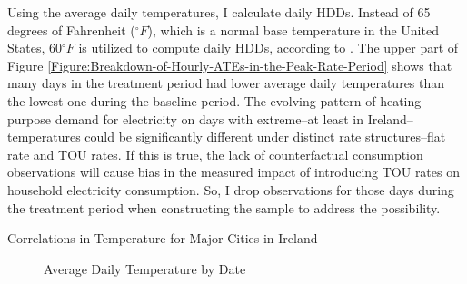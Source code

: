 Using the average daily temperatures, I calculate daily HDDs. Instead of 65 degrees of Fahrenheit ($^{\circ}F$), which is a normal base temperature in the United States, 60$^{\circ}F$ is utilized to compute daily HDDs, according to \cite{The-Impacts-of-Climate-Change-on-Domestic-Natural-Gas-Consumption-in-the-Greater-Dublin-Region_Liu-and-Sweeney_2012}. The upper part of Figure \ref{Figure:Breakdown-of-Hourly-ATEs-in-the-Peak-Rate-Period} shows that many days in the treatment period had lower average daily temperatures than the lowest one during the baseline period. The evolving pattern of heating-purpose demand for electricity on days with extreme--at least in Ireland--temperatures could be significantly different under distinct rate structures--flat rate and TOU rates. If this is true, the lack of counterfactual consumption observations will cause bias in the measured impact of introducing TOU rates on household electricity consumption. So, I drop observations for those days during the treatment period when constructing the sample to address the possibility. 

\begin{table}
\caption{Correlations in Temperature for Major Cities in Ireland}
\label{Table:Correlations-in-Temperature-for-Major-Cities-in-Ireland}
\end{table} 
 
\begin{figure}
\caption{Average Daily Temperature by Date}
\label{Figure:Average-Daily-Temperature-by-Date}
\end{figure}
